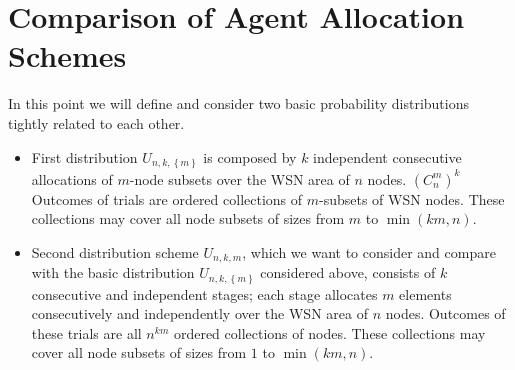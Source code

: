 \documentclass[conference]{IEEEtran}
\begin{document}
\section{Comparison of Agent Allocation Schemes}
In this point we will define and consider two basic probability distributions tightly related to each other.
\begin{itemize}
	\item First distribution $U_{n,k,\left\{m\right\}}$ is composed by $k$ independent consecutive allocations of $m$-node subsets over the WSN area of $n$ nodes. $\left(C_{n}^{m}\right)^{k}$ Outcomes of trials are ordered collections of $m$-subsets of WSN nodes. These collections may cover all node subsets of sizes from $m$ to $\min(km,n)$. 
	
	\item Second distribution scheme $U_{n,k,m}$, which we want to consider and compare with the basic distribution $U_{n,k,\left\{m\right\}}$ considered above, consists of $k$ consecutive and independent stages; each stage allocates $m$ elements consecutively and independently over the WSN area of $n$ nodes. Outcomes of these trials are all $n^{km}$ ordered collections of nodes. These collections may cover all node subsets of sizes from $1$ to $\min(km,n)$. 
\end{itemize}
\end{document}
